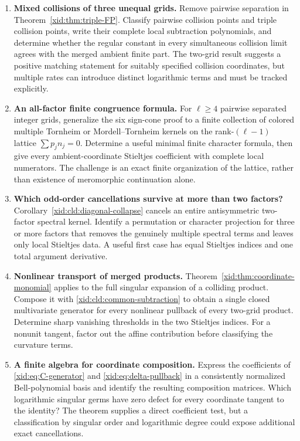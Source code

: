 \documentclass[11pt,a4paper]{article}
\numberwithin{equation}{section}
\theoremstyle{definition}
\theoremstyle{remark}
\begin{document}
\begin{enumerate}[label=\textbf{Q\arabic*.},leftmargin=*]
\item \textbf{Mixed collisions of three unequal grids.}
Remove pairwise separation in Theorem~\ref{xid:thm:triple-FP}. Classify
pairwise collision points and triple collision points, write their
complete local subtraction polynomials, and determine whether the
regular constant in every simultaneous collision limit agrees with the
merged ambient finite part. The two-grid result suggests a positive
matching statement for suitably specified collision coordinates, but
multiple rates can introduce distinct logarithmic terms and must be
tracked explicitly.

\item \textbf{An all-factor finite congruence formula.}
For $\ell\ge4$ pairwise separated integer grids, generalize the six
sign-cone proof to a finite collection of colored multiple Tornheim or
Mordell--Tornheim kernels on the rank-$(\ell-1)$ lattice
$\sum p_jn_j=0$. Determine a useful minimal finite character formula,
then give every ambient-coordinate Stieltjes coefficient with complete
local numerators. The challenge is an exact finite organization of the
lattice, rather than existence of meromorphic continuation alone.

\item \textbf{Which odd-order cancellations survive at more than two
factors?}
Corollary~\ref{xid:cld:diagonal-collapse} cancels an entire antisymmetric
two-factor spectral kernel. Identify a permutation or character
projection for three or more factors that removes the genuinely
multiple spectral terms and leaves only local Stieltjes data. A useful
first case has equal Stieltjes indices and one total argument derivative.

\item \textbf{Nonlinear transport of merged products.}
Theorem~\ref{xid:thm:coordinate-monomial} applies to the full singular
expansion of a colliding product. Compose it with
\eqref{xid:cld:common-subtraction} to obtain a single closed multivariate
generator for every nonlinear pullback of every two-grid product.
Determine sharp vanishing thresholds in the two Stieltjes indices.
For a nonunit tangent, factor out the affine contribution before
classifying the curvature terms.

\item \textbf{A finite algebra for coordinate composition.}
Express the coefficients of \eqref{xid:eq:C-generator} and
\eqref{xid:eq:delta-pullback} in a consistently normalized Bell-polynomial
basis and identify the resulting composition matrices. Which
logarithmic singular germs have zero defect for every coordinate tangent
to the identity? The theorem supplies a direct coefficient test, but a
classification by singular order and logarithmic degree could expose
additional exact cancellations.


\end{enumerate}
\end{document}
